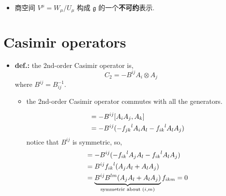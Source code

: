 \begin{itemize}
	\noindent\rule[0.5ex]{\linewidth}{0.5pt} %
	
	\item 商空间 $V^\mu = W_\mu / U_\mu$ 构成 $\mathfrak{g}$ 的一个\textbf{不可约}表示.
	
	\begin{tcolorbox}[title=proof:]
		
	\end{tcolorbox}
\end{itemize}

\section{Casimir operators}
\begin{itemize}
	\item \textbf{\textbf{def.:}} the 2nd-order Casimir operator is,
	\begin{equation}
		C_2 = - B^{i j} A_i \otimes A_j
	\end{equation}
	where $B^{i j} = B^{- 1}_{i j}$.
	\begin{itemize}
		\item the 2nd-order Casimir operator commutes with all the generators.
		
		\begin{tcolorbox}[title=proof:]
			\begin{align}
				[C_2, A_k] &= - B^{i j} [A_i A_j, A_k] \notag \\
				&= - B^{i j} (- {f_{j k}}^l A_i A_l - {f_{i k}}^l A_l A_j)
			\end{align}
			notice that $B^{i j}$ is symmetric, so,
			\begin{align}
				[C_2, A_k] &= - B^{i j} (- {f_{i k}}^l A_j A_l - {f_{i k}}^l A_l A_j) \notag \\
				&= B^{i j} {f_{i k}}^l (A_j A_l + A_l A_j) \notag \\
				&= \underbrace{B^{i j} B^{l m} (A_j A_l + A_l A_j)}_{\text{symmetric about } (i, m)} f_{i k m} = 0
			\end{align}
		\end{tcolorbox}
	\end{itemize}
\end{itemize}
